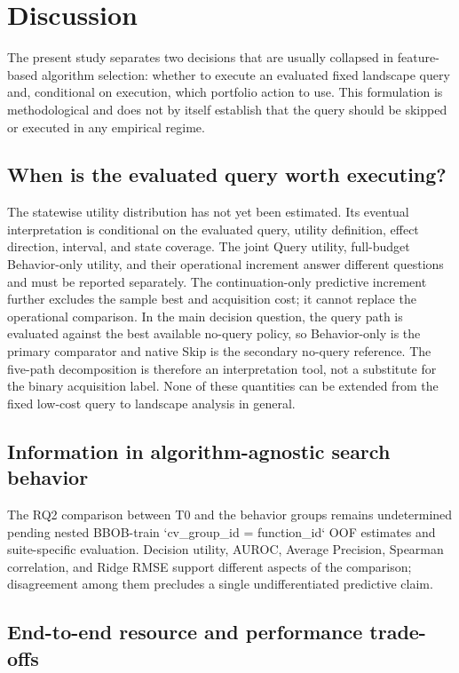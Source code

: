 \section{Discussion}
\label{sec:discussion}

The present study separates two decisions that are usually collapsed in
feature-based algorithm selection: whether to execute an evaluated fixed
landscape query and, conditional on execution, which portfolio action to use.
This formulation is methodological and does not by itself establish that the
query should be skipped or executed in any empirical regime.

\subsection{When is the evaluated query worth executing?}

 The statewise utility distribution has not yet been
estimated.  Its eventual interpretation is conditional on the evaluated query,
utility definition, effect direction, interval, and state coverage.  The joint Query utility, full-budget Behavior-only utility, and their operational increment answer different questions and must be reported separately.  The continuation-only predictive increment further excludes the sample best and acquisition cost; it cannot replace the operational comparison.  In the main decision question, the query path is evaluated against the best available no-query policy, so Behavior-only is the primary comparator and native Skip is the secondary no-query reference.  The five-path decomposition is therefore an interpretation tool, not a substitute for the binary acquisition label.  None of these quantities can be extended from the fixed low-cost query to landscape analysis in general.

\subsection{Information in algorithm-agnostic search behavior}

 The RQ2 comparison between T0 and the behavior groups remains
undetermined pending nested BBOB-train `cv_group_id = function_id` OOF estimates and
suite-specific evaluation.  Decision utility, AUROC, Average Precision, Spearman correlation,
and Ridge RMSE support different aspects of the comparison; disagreement among
them precludes a single undifferentiated predictive claim.

\subsection{End-to-end resource and performance trade-offs}

